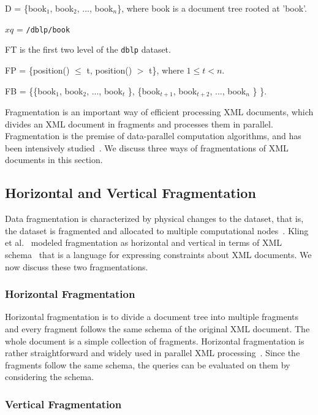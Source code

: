 D = \{book$_1$, book$_2$, ..., book$_n$\}, where book is a document tree rooted
at 'book'.

$xq$ = \verb|/dblp/book|

FT is the first two level of the \texttt{dblp} dataset.

FP = \{position() $\le$ t, position() $>$ t\}, where $1 \le t < n$.

FB = \{\{book$_1$, book$_2$, ..., book$_t$ \}, \{book$_{t+1}$, book$_{t+2}$, ...,
book$_n$ \} \}.



Fragmentation is an important way of efficient processing XML documents, which
divides an XML document in fragments and processes them in parallel.
Fragmentation is the premise of data-parallel computation algorithms, and has
been intensively studied~\cite{ARBM06,DaGP14,CFKL12,NEMH07,OgTP13,LiZZ17,
	CFKL12,DaGP14}. We discuss three ways of fragmentations of XML documents in this
section.

\subsection{Horizontal and Vertical Fragmentation}

Data fragmentation is characterized by physical changes to the dataset, that is,
the dataset is fragmented and allocated to multiple computational
nodes~\cite{BrMa14}. Kling et al.~\cite{kling11:dist_xml} modeled fragmentation
as horizontal and vertical in terms of XML schema~\cite{schema} that is a
language for expressing constraints about XML documents. We now discuss these
two fragmentations.

\subsubsection{Horizontal Fragmentation}
\label{sec:hfragment}

Horizontal fragmentation is to divide a document tree into multiple fragments
and every fragment follows the same schema of the original XML document. The
whole document is a simple collection of fragments. Horizontal fragmentation is
rather straightforward and widely used in parallel XML
processing~\cite{DaGP14,BoLS09,AfDG15,CCMN15}. Since the fragments follow the
same schema, the queries can be evaluated on them by considering the schema.

\subsubsection{Vertical Fragmentation}
\label{sec:vfragment}

